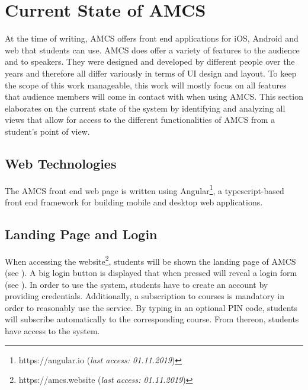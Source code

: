 \chapter{Current State of AMCS}
\label{chapter:stateoftheart}
At the time of writing, AMCS offers front end applications for iOS, Android and web that students can use. AMCS does offer a variety of features to the audience and to speakers. They were designed and developed by different people over the years and therefore all differ variously in terms of UI design and layout.
To keep the scope of this work manageable, this work will mostly focus on all features that audience members will come in contact with when using AMCS.
This section elaborates on the current state of the system by identifying and analyzing all views that allow for access to the different functionalities of AMCS from a student's point of view. 

\section{Web Technologies}
The AMCS front end web page is written using Angular\footnote{https://angular.io (\emph{last access: 01.11.2019})}, a typescript-based front end framework for building mobile and desktop web applications.

\section{Landing Page and Login}
\label{section:landingpage}
When accessing the website\footnote{https://amcs.website (\emph{last access: 01.11.2019})}, students will be shown the landing page of AMCS (see ). A big login button is displayed that when pressed will reveal a login form (see ).
In order to use the system, students have to create an account by providing credentials.
\newline
\newline
Additionally, a subscription to courses is mandatory in order to reasonably use the service. By typing in an optional PIN code, students will subscribe automatically to the corresponding course. From thereon, students have access to the system. 
 
